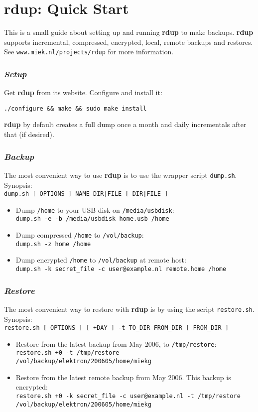 \documentclass[a4paper, openany]{memoir}
\newcommand{\rdup}{\textbf{rdup}}
\newcommand{\cmd}[1]{\texttt{#1}}
\newcommand{\url}[1]{\texttt{#1}}
\newcommand{\path}[1]{\texttt{#1}}
\begin{document}
\chapter*{\rdup: Quick Start}
This is a small guide about setting up and running \rdup{} to make
backups. \rdup{}
supports incremental, compressed, encrypted, local, remote  backups and
restores. 
See \url{www.miek.nl/projects/rdup} for more information.

\subsection*{\textit{Setup}}
Get \rdup{} from its website. Configure and install it:
\begin{verbatim}
./configure && make && sudo make install
\end{verbatim}
\rdup{} by default creates a full dump once a month and 
daily incrementals after that (if desired).

\subsection*{\textit{Backup}}
The most convenient way to use \rdup{} is to use the wrapper
script \cmd{dump.sh}. Synopsis:\\
\cmd{dump.sh [ OPTIONS ] NAME DIR|FILE [ DIR|FILE ]}
\begin{itemize}
\item
Dump \path{/home} to your USB disk on \path{/media/usbdisk}:\\
\cmd{dump.sh -e -b /media/usbdisk home.usb /home}
\item
Dump compressed \path{/home} to \path{/vol/backup}:\\
\cmd{dump.sh -z home /home} 
\item
Dump encrypted \path{/home} to \path{/vol/backup} at remote
host:\\
\cmd{dump.sh -k secret\_file -c user@example.nl remote.home /home}
\end{itemize}

\subsection*{\textit{Restore}}
The most convenient way to restore with \rdup{} is by using
the script \cmd{restore.sh}. Synopsis:\\
\cmd{restore.sh [ OPTIONS ] [ +DAY ] -t TO\_DIR FROM\_DIR [ FROM\_DIR ]}
\begin{itemize}
\item
Restore from the latest backup from May 2006, to \path{/tmp/restore}:\\
\cmd{restore.sh +0 -t /tmp/restore \\
/vol/backup/elektron/200605/home/miekg}
\item
Restore from the latest remote backup from May 2006. This backup
is encrypted:\\
\cmd{restore.sh +0 -k secret\_file -c user@example.nl -t /tmp/restore \\
/vol/backup/elektron/200605/home/miekg}
\end{itemize}
\end{document}
